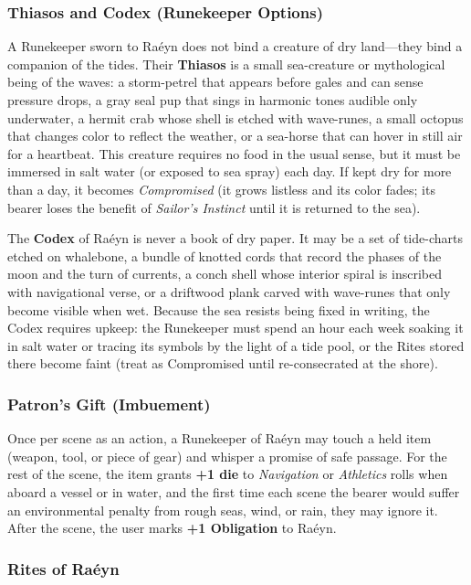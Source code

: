 \subsubsection*{Thiasos and Codex (Runekeeper Options)}

A Runekeeper sworn to Raéyn does not bind a creature of dry land---they bind a companion of the tides. Their \textbf{Thiasos} is a small sea-creature or mythological being of the waves: a storm-petrel that appears before gales and can sense pressure drops, a gray seal pup that sings in harmonic tones audible only underwater, a hermit crab whose shell is etched with wave-runes, a small octopus that changes color to reflect the weather, or a sea-horse that can hover in still air for a heartbeat. This creature requires no food in the usual sense, but it must be immersed in salt water (or exposed to sea spray) each day. If kept dry for more than a day, it becomes \textit{Compromised} (it grows listless and its color fades; its bearer loses the benefit of \textit{Sailor's Instinct} until it is returned to the sea).

The \textbf{Codex} of Raéyn is never a book of dry paper. It may be a set of tide-charts etched on whalebone, a bundle of knotted cords that record the phases of the moon and the turn of currents, a conch shell whose interior spiral is inscribed with navigational verse, or a driftwood plank carved with wave-runes that only become visible when wet. Because the sea resists being fixed in writing, the Codex requires upkeep: the Runekeeper must spend an hour each week soaking it in salt water or tracing its symbols by the light of a tide pool, or the Rites stored there become faint (treat as Compromised until re-consecrated at the shore).

\subsubsection*{Patron's Gift (Imbuement)}

Once per scene as an action, a Runekeeper of Raéyn may touch a held item (weapon, tool, or piece of gear) and whisper a promise of safe passage. For the rest of the scene, the item grants \textbf{+1 die} to \textit{Navigation} or \textit{Athletics} rolls when aboard a vessel or in water, and the first time each scene the bearer would suffer an environmental penalty from rough seas, wind, or rain, they may ignore it. After the scene, the user marks \textbf{+1 Obligation} to Raéyn.

\subsubsection*{Rites of Raéyn}

